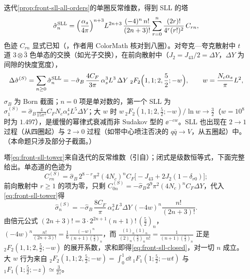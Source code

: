 \begin{proposition}\label{prop:front-sll-closed-form}
迭代\cref{prop:front-sll-all-orders}的单圈反常维数，得到 SLL 的塔
\begin{equation}\label{eq:front-sll-tower}
\hat\sigma_n^{\rm SLL}=\Bigl(\frac{\alpha_s}{4\pi}\Bigr)^{n+3}L^{2n+3}\,\frac{(-4)^n\,n!}{(2n+3)!}\sum_{r=0}^n\frac{(2r)!}{4^r(r!)^2}\,C_{rn},
\end{equation}
色迹 $C_{rn}$ 显式已知（\cite[式~(14)--(21)]{Becher:2021zkk}，作者用 ColorMath 核对到八圈）。对夸克—夸克散射中 $t$ 道 $3\otimes\bar3$ 色单态的交换（如光子交换），在前向散射中（$J_2=J_{43}/2=\Delta Y$，$\Delta Y$ 为间隙的快度宽度），
\begin{equation}\label{eq:front-sll-closed}
\Delta\hat\sigma^{(S)}=\sum_{n\ge0}\hat\sigma_n^{\rm SLL}=-\hat\sigma_B\,\frac{4C_F}{3\pi}\,\alpha_s^3L^3\,\Delta Y\;{}_2F_2\Bigl(1,1;2,\frac52;-w\Bigr),\qquad w=\frac{N_c\alpha_s}{\pi}L^2 ,
\end{equation}
$\hat\sigma_B$ 为 Born 截面；$n=0$ 项是单对数的，第一个 SLL 为 $\hat\sigma_1^{(S)}=\hat\sigma_B\frac{4}{15\pi^2}C_FN_c\alpha_s^4L^5\Delta Y$；大 $w$ 时 $w\,{}_2F_2(1,1;2,\frac52;-w)/\ln w\to\frac32$（$w=10^8$ 时为 $1.497$），是缓慢的幂律式衰减而非 Sudakov 型的 $\ee^{-cw}$。SLL 也出现在 $2\to1$ 过程（从四圈起）与 $2\to0$ 过程（如带中心喷注否决的 $q\bar q\to V$，从五圈起）中。（本命题只涉及部分子截面。）
\end{proposition}

\begin{proofsketch}
塔\cref{eq:front-sll-tower}来自迭代的反常维数（引自\cite{Becher:2021zkk}）；闭式是级数恒等式，下面完整给出。单态道的色迹为\cite[式~(19)]{Becher:2021zkk}
\begin{equation*}
C^{(S)}_{rn}=\hat\sigma_B\,2^{8-r}\pi^2(4N_c)^nC_F\bigl[-J_{43}+2J_2(1-\delta_{r0})\bigr];
\end{equation*}
前向散射中 $r\ge1$ 的项为零，只剩 $C^{(S)}_{0n}=-\hat\sigma_B2^9\pi^2(4N_c)^nC_F\Delta Y$，代入\cref{eq:front-sll-tower}得
\begin{equation*}
\hat\sigma^{(S)}_n=-\hat\sigma_B\,\frac{8C_F}{\pi}\,\alpha_s^3L^3\Delta Y\,(-4w)^n\frac{n!}{(2n+3)!}.
\end{equation*}由倍元公式 $(2n+3)!=3\cdot2^{2n+1}(n+1)!\,(\frac52)_n$，$(-4w)^n\frac{n!}{(2n+3)!}=\frac16\frac{(-w)^n}{(n+1)(\frac52)_n}$，而 $\frac{(1)_n(1)_n}{(2)_n(\frac52)_n\,n!}=\frac{1}{(n+1)(\frac52)_n}$ 正是 ${}_2F_2(1,1;2,\frac52;-w)$ 的展开系数，求和即得\cref{eq:front-sll-closed}，对一切 $n$ 成立。大 $w$ 行为来自 ${}_2F_2(1,1;2,\frac52;-w)=\int_0^1\dd t\,{}_1F_1(1;\frac52;-wt)$ 与 ${}_1F_1(1;\frac52;-z)\simeq\frac{3}{2z}$。
\end{proofsketch}

